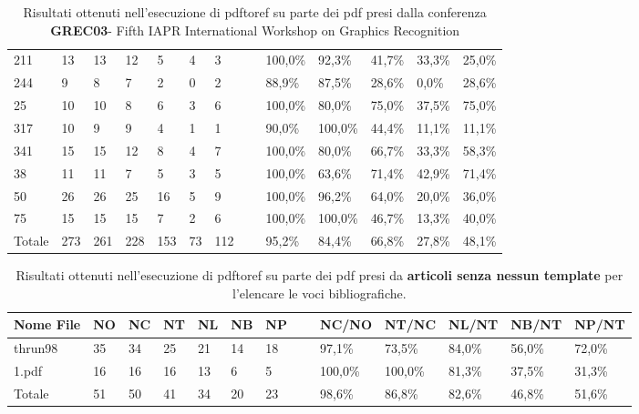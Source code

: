 \begin{table}
\begin{center}
\begin{tabular}{|l|l|l|l|l|l|l|l|l|l|l|l|l|}
211 & 13 & 13 & 12 & 5 & 4 & 3 & ~ & 100,0\% & 92,3\% & 41,7\% & 33,3\% & 25,0\%\\
244 & 9 & 8 & 7 & 2 & 0 & 2 & ~ & 88,9\% & 87,5\% & 28,6\% & 0,0\% & 28,6\%\\
25 & 10 & 10 & 8 & 6 & 3 & 6 & ~ & 100,0\% & 80,0\% & 75,0\% & 37,5\% & 75,0\%\\
317 & 10 & 9 & 9 & 4 & 1 & 1 & ~ & 90,0\% & 100,0\% & 44,4\% & 11,1\% & 11,1\%\\
341 & 15 & 15 & 12 & 8 & 4 & 7 & ~ & 100,0\% & 80,0\% & 66,7\% & 33,3\% & 58,3\%\\
38 & 11 & 11 & 7 & 5 & 3 & 5 & ~ & 100,0\% & 63,6\% & 71,4\% & 42,9\% & 71,4\%\\
50 & 26 & 26 & 25 & 16 & 5 & 9 & ~ & 100,0\% & 96,2\% & 64,0\% & 20,0\% & 36,0\%\\
75 & 15 & 15 & 15 & 7 & 2 & 6 & ~ & 100,0\% & 100,0\% & 46,7\% & 13,3\% & 40,0\%\\ \hline
Totale & 273 & 261 & 228 & 153 & 73 & 112 & ~ & 95,2\% & 84,4\% & 66,8\% & 27,8\% & 48,1\%\\ \hline
	\end{tabular}
	\tiny{\caption{Risultati ottenuti nell'esecuzione di pdftoref su parte dei pdf presi dalla conferenza \textbf{GREC03}- Fifth IAPR International Workshop on Graphics Recognition}}
	\end{center}
	\end{table}
	

	\begin{table}\label{tab:articoli}
	\begin{center}
	\begin{tabular}{|l|l|l|l|l|l|l|l|l|l|l|l|l|} \hline
Nome File & NO & NC & NT & NL & NB & NP & ~ & NC/NO & NT/NC & NL/NT & NB/NT & NP/NT \\ \hline
thrun98 & 35 & 34 & 25 & 21 & 14 & 18 & ~ & 97,1\% & 73,5\% & 84,0\% & 56,0\% & 72,0\%\\
1.pdf & 16 & 16 & 16 & 13 & 6 & 5 & ~ & 100,0\% & 100,0\% & 81,3\% & 37,5\% & 31,3\%\\ \hline
Totale & 51 & 50 & 41 & 34 & 20 & 23 & ~ & 98,6\% & 86,8\% & 82,6\% & 46,8\% & 51,6\%\\ \hline
	\end{tabular}
	\tiny{\caption{Risultati ottenuti nell'esecuzione di pdftoref su parte dei pdf presi da \textbf{articoli senza nessun template} per l'elencare le voci bibliografiche.}}
	\end{center}
	\end{table}
	
